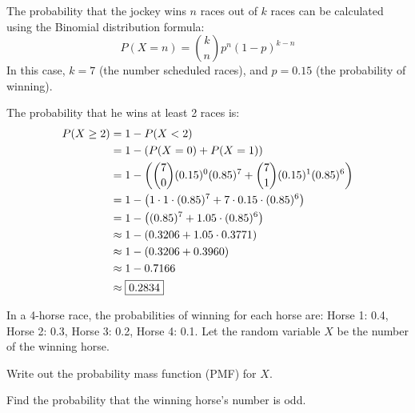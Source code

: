 \documentclass[a4paper, 10pt]{article}
\begin{document}
\begin{solution}
The probability that the jockey wins \( n \) races out of \( k \) races
can be calculated using the Binomial distribution formula:
\[
    P(X = n) = \binom{k}{n} p^n (1-p)^{k-n}
\]
In this case, \( k = 7 \) (the number scheduled races), and \( p = 0.15 \) (the probability of winning).

\par\noindent The probability that he wins at least 2 races is:
\begin{align*}
    P(X \geq 2) &= 1 - P(X < 2) \\
    &= 1 - (P(X = 0) + P(X = 1)) \\
    &= 1 - \left( \binom{7}{0} (0.15)^0 (0.85)^7 + \binom{7}{1} (0.15)^1 (0.85)^6 \right) \\
    &= 1 - \left( 1 \cdot 1 \cdot (0.85)^7 + 7 \cdot 0.15 \cdot (0.85)^6 \right) \\
    &= 1 - \left( (0.85)^7 + 1.05 \cdot (0.85)^6 \right) \\
    &\approx 1 - \left( 0.3206 + 1.05 \cdot 0.3771 \right) \\
    &\approx 1 - (0.3206 + 0.3960) \\
    &\approx 1 - 0.7166 \\
    &\approx \boxed{0.2834}
\end{align*}
\end{solution}


\begin{problem}
In a 4-horse race, the probabilities of winning for each horse are:
Horse 1: 0.4, Horse 2: 0.3, Horse 3: 0.2, Horse 4: 0.1.
Let the random variable \( X \) be the number of the winning horse.
\begin{subproblems}
    \item Write out the probability mass function (PMF) for \( X \).
    \item Find the probability that the winning horse's number is odd.
\end{subproblems}
\end{problem}
\end{document}
